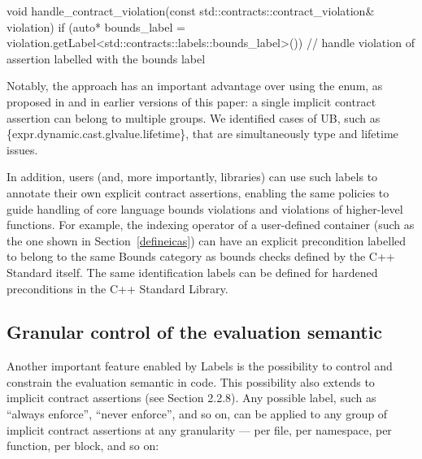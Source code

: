 {\begin{codeblock}
void handle_contract_violation(const std::contracts::contract_violation& violation)
{
  if (auto* bounds_label =
      violation.getLabel<std::contracts::labels::bounds_label>()) {
      // handle violation of assertion labelled with the bounds label
  }
}
\end{codeblock} 

%
%

Notably, the \cite{P3400R1} approach has an important advantage over using the  enum, as proposed in \cite{P3081R1} and in earlier versions of this paper: a single implicit contract assertion can belong to multiple groups. We identified cases of UB, such as \{expr.dynamic.cast.glvalue.lifetime\}, that are simultaneously type and lifetime issues.

In addition, users (and, more importantly, libraries) can use such labels to annotate their own explicit contract assertions, enabling the same policies to guide handling of core language bounds violations and violations of higher-level functions. For example, the indexing operator of a user-defined container (such as the one shown in Section~\ref{defineicas}) can have an explicit precondition labelled to belong to the same Bounds category as bounds checks defined by the C++ Standard itself. The same identification labels can be defined for hardened preconditions in the C++ Standard Library.

\subsection{Granular control of the evaluation semantic}
\label{semantic}

Another important feature enabled by Labels is the possibility to control and constrain the evaluation semantic in code. This possibility also extends to implicit contract assertions (see \cite{P3400R1} Section 2.2.8). Any possible label, such as ``always enforce'', ``never enforce'', and so on, can be applied to any group of implicit contract assertions at any granularity --- per file, per namespace, per function, per block, and so on:

}
